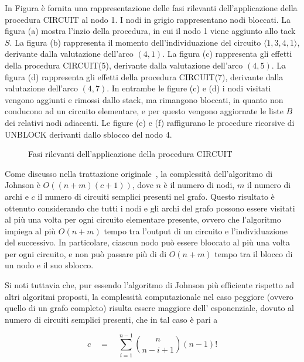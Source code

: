 


In Figura \label{fig:circuit-example} \`e fornita una rappresentazione delle fasi rilevanti dell'applicazione della
procedura CIRCUIT al nodo 1. I nodi in grigio rappresentano nodi bloccati.
La figura (a) mostra l'inzio della procedura, in cui il nodo 1 viene aggiunto allo tack $S$.
La figura (b) rappresenta il momento dell'individuazione del circuito $\langle 1, 3, 4, 1 \rangle$, derivante dalla valutazione
dell'arco $(4, 1)$.
La figura (c) rappresenta gli effetti della procedura CIRCUIT(5), derivante dalla valutazione dell'arco $(4, 5)$.
La figura (d) rappresenta gli effetti della procedura CIRCUIT(7), derivante dalla valutazione dell'arco $(4, 7)$.
In entrambe le figure (c) e (d) i nodi visitati vengono aggiunti e rimossi dallo stack, ma rimangono bloccati,
in quanto non conducono ad un circuito elementare, e per questo vengono aggiornate le liste $B$ dei relativi
nodi adiacenti.
Le figure (e) e (f) raffigurano le procedure ricorsive di UNBLOCK derivanti dallo sblocco del nodo 4.

\begin{figure}[!h] \centering
    
\caption{Fasi rilevanti dell'applicazione della procedura CIRCUIT}\label{fig:cicruit-example}
\end{figure}

\newpage

Come discusso nella trattazione originale~\cite{doi:10.1137/0204007}, la complessit\`a dell'algoritmo di Johnson
\`e $O((n + m)(c + 1))$, dove $n$ \`e il numero di nodi, $m$ il numero di archi e $c$ il numero di circuiti semplici
presenti nel grafo.
Questo risultato \`e ottenuto considerando che tutti i nodi e gli archi del grafo possono essere visitati al pi\`u una
volta per ogni circuito elementare presente, ovvero che l'algoritmo impiega al pi\`u $O(n + m)$ tempo tra l'output di
un circuito e l'individuazione del successivo.
In particolare, ciascun nodo pu\`o essere bloccato al pi\`u una volta per ogni circuito, e non pu\`o passare pi\`u di
di $O(n + m)$ tempo tra il blocco di un nodo e il suo sblocco. \newline

Si noti tuttavia che, pur essendo l'algoritmo di Johnson pi\`u efficiente rispetto ad altri algoritmi proposti, la
complessit\`a computazionale nel caso peggiore (ovvero quello di un grafo completo) risulta essere maggiore dell'
esponenziale, dovuto al numero di circuiti semplici presenti, che in tal caso \`e pari a

\begin{equation*}
    c \quad = \quad \sum_{i = 1}^{n-1} \binom{n}{n-i+1} (n-1)!
\end{equation*}


